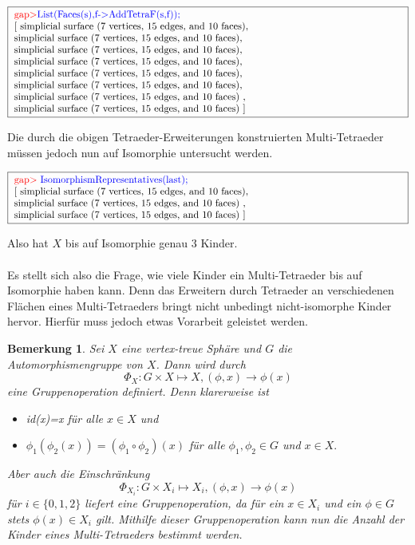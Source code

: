 \documentclass[12pt,titlepage,twoside,cleardoublepage]{article}
\theoremstyle{nummermitklammern}
\newtheorem{bemerkung}[temp]{Bemerkung}
\newtheorem{bemerkung}[zahl]{Bemerkung}
\numberwithin{equation}{section}
\begin{document}
\begin{center}
$\fbox{
\parbox{14cm}{
\textcolor{red}{gap$>$}\textcolor{blue}{ List(Faces(s),f-$>$AddTetraF(s,f));}\newline
[ simplicial surface (7 vertices, 15 edges, and 10 faces),\newline
simplicial surface (7 vertices, 15 edges, and 10 faces),\newline
 simplicial surface (7 vertices, 15 edges, and 10 faces),\newline
 simplicial surface (7 vertices, 15 edges, and 10 faces),\newline
 simplicial surface (7 vertices, 15 edges, and 10 faces),\newline
 simplicial surface (7 vertices, 15 edges, and 10 faces),\newline
  simplicial surface (7 vertices, 15 edges, and 10 faces)
    ,\newline
  simplicial surface (7 vertices, 15 edges, and 10 faces)
 ]
 }}$
 \end{center}
 Die durch die obigen Tetraeder-Erweiterungen konstruierten Multi-Tetraeder müssen jedoch nun auf Isomorphie untersucht werden.
 \begin{center} 
 $\fbox{
\parbox{14cm}{
\textcolor{red}{gap$>$} \textcolor{blue}{IsomorphismRepresentatives(last);}\newline
[ simplicial surface (7 vertices, 15 edges, and 10 faces),\newline
 simplicial surface (7 vertices, 15 edges, and 10 faces)
    ,
    \newline
  simplicial surface (7 vertices, 15 edges, and 10 faces)
 ]
}}$
\end{center}
Also hat $X$ bis auf Isomorphie genau 3 Kinder. \\\\
Es stellt sich also die Frage, wie viele Kinder ein Multi-Tetraeder bis auf Isomorphie haben kann. Denn das Erweitern durch Tetraeder an verschiedenen Flächen eines Multi-Tetraeders bringt nicht unbedingt nicht-isomorphe Kinder hervor. Hierfür muss jedoch etwas Vorarbeit geleistet werden.
\begin{bemerkung} 
Sei $X$ eine vertex-treue Sphäre und $G$ die Automorphismengruppe von $X$. Dann wird durch 
\[
\Phi_X:G \times X\mapsto X,(\phi, x)\to \phi(x)
\] eine Gruppenoperation definiert. Denn klarerweise ist
\begin{itemize}
\item id(x)=x für alle $x\in X$ und
\item $\phi_1(\phi_2 (x))=(\phi_1 \circ\phi_2)(x)$ für alle $\phi_1,\phi_2 \in G$ und $x\in X.$
\end{itemize}
Aber auch die Einschränkung   
\[
\Phi_{X_i}:G \times X_i\mapsto X_i,(\phi, x)\to \phi(x)
\] für $i\in \{0,1,2\}$ liefert eine Gruppenoperation, da für ein $x\in X_i$ und ein $\phi\in G$ stets $\phi(x)\in X_i$ gilt. Mithilfe dieser Gruppenoperation kann nun die Anzahl der Kinder eines Multi-Tetraeders bestimmt werden.
\end{bemerkung}
\end{document}
